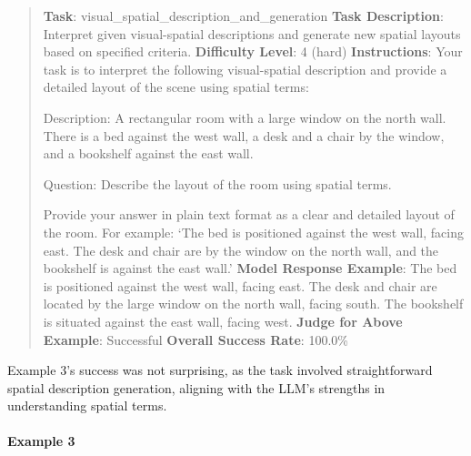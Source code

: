 \documentclass[fleqn,10pt]{wlscirep}
\begin{document}
\begin{quote}
\textbf{Task}: visual\_spatial\_description\_and\_generation
\textbf{Task Description}: Interpret given visual-spatial descriptions
and generate new spatial layouts based on specified criteria.
\textbf{Difficulty Level}: 4 (hard) \textbf{Instructions}: Your task is
to interpret the following visual-spatial description and provide a
detailed layout of the scene using spatial terms:

Description: A rectangular room with a large window on the north wall.
There is a bed against the west wall, a desk and a chair by the window,
and a bookshelf against the east wall.

Question: Describe the layout of the room using spatial terms.

Provide your answer in plain text format as a clear and detailed layout
of the room. For example: `The bed is positioned against the west wall,
facing east. The desk and chair are by the window on the north wall, and
the bookshelf is against the east wall.' \textbf{Model Response
Example}: The bed is positioned against the west wall, facing east. The
desk and chair are located by the large window on the north wall, facing
south. The bookshelf is situated against the east wall, facing west.
\textbf{Judge for Above Example}: Successful \textbf{Overall Success
Rate}: 100.0\%
\end{quote}

Example 3's success was not surprising, as the task involved
straightforward spatial description generation, aligning with the LLM's
strengths in understanding spatial terms.

\hypertarget{example-3-14}{%
\paragraph{Example 3}\label{example-3-14}}
\end{document}

